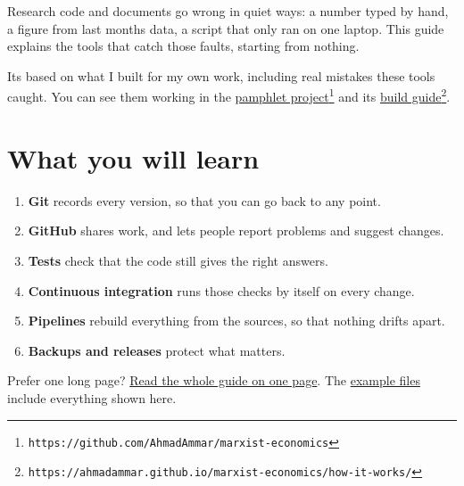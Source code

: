 Research code and documents go wrong in quiet ways: a number typed by hand, a figure from last month\textquotesingle s data, a script that only ran on one laptop. This guide explains the tools that catch those faults, starting from nothing.

It\textquotesingle s based on what I built for my own work, including real mistakes these tools caught. You can see them working in the \href{https://github.com/AhmadAmmar/marxist-economics}{pamphlet project}\footnote{\texttt{https://github.com/AhmadAmmar/marxist-economics}} and its \href{https://ahmadammar.github.io/marxist-economics/how-it-works/}{build guide}\footnote{\texttt{https://ahmadammar.github.io/marxist-economics/how-it-works/}}.

\section{What you will learn}\label{what-you-will-learn}

\begin{enumerate}
\def\labelenumi{\arabic{enumi}.}
\tightlist
\item
  \textbf{Git} records every version, so that you can go back to any point.
\item
  \textbf{GitHub} shares work, and lets people report problems and suggest changes.
\item
  \textbf{Tests} check that the code still gives the right answers.
\item
  \textbf{Continuous integration} runs those checks by itself on every change.
\item
  \textbf{Pipelines} rebuild everything from the sources, so that nothing drifts apart.
\item
  \textbf{Backups and releases} protect what matters.
\end{enumerate}

Prefer one long page? \href{full/}{Read the whole guide on one page}. The \href{examples/git-ci-examples.zip}{example files} include everything shown here.


